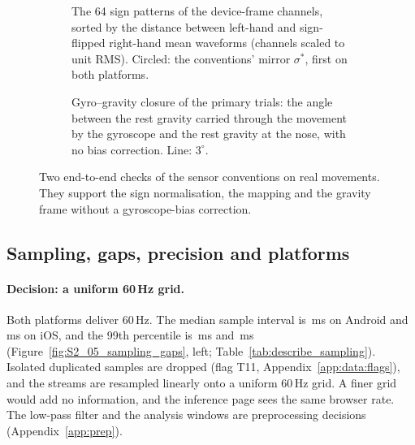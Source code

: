 \begin{figure}[htbp]
\centering
\begin{subfigure}[t]{0.49\linewidth}\centering
  \caption{The 64 sign patterns of the device-frame channels, sorted by the distance between left-hand and
  sign-flipped right-hand mean waveforms (channels scaled to unit RMS). Circled: the conventions' mirror
  $\sigma^*$, first on both platforms.}\label{fig:S2_12_sign_patterns}
\end{subfigure}\hfill
\begin{subfigure}[t]{0.49\linewidth}\centering
  \caption{Gyro--gravity closure of the primary trials: the angle between the rest gravity carried through the
  movement by the gyroscope and the rest gravity at the nose, with no bias correction. Line: $3^\circ$.}
  \label{fig:S2_17_gravity_closure}
\end{subfigure}
\caption{Two end-to-end checks of the sensor conventions on real movements. They support the sign
normalisation, the  mapping and the gravity frame without a gyroscope-bias correction.}
\label{fig:app:data-conventions}
\end{figure}

\subsection{Sampling, gaps, precision and platforms}\label{app:data:sampling}

\paragraph{Decision: a uniform 60\,Hz grid.} Both platforms deliver 60\,Hz. The median sample interval is
\,ms on Android and \,ms on iOS, and
the 99th percentile is \,ms and \,ms
(Figure~\ref{fig:S2_05_sampling_gaps}, left; Table~\ref{tab:describe_sampling}). Isolated duplicated samples
are dropped (flag T11, Appendix~\ref{app:data:flags}), and the streams are resampled linearly onto a uniform
60\,Hz grid. A finer grid would add no information, and the inference page sees the same browser rate. The
low-pass filter and the analysis windows are preprocessing decisions (Appendix~\ref{app:prep}).

